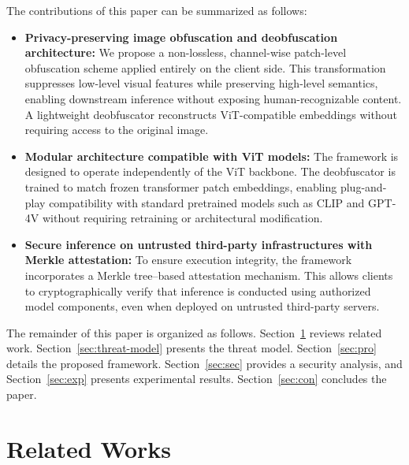 \documentclass{ieeeaccess}
\newcommand{\rev}[1]{{\color{green}#1}}
\begin{document}
The contributions of this paper can be summarized as follows:
\begin{itemize}
    \item \rev{\textbf{Privacy-preserving image obfuscation and deobfuscation architecture:} We propose a non-lossless, channel-wise patch-level obfuscation scheme applied entirely on the client side. This transformation suppresses low-level visual features while preserving high-level semantics, enabling downstream inference without exposing human-recognizable content. A lightweight deobfuscator reconstructs ViT-compatible embeddings without requiring access to the original image.}
    \item \textbf{Modular architecture compatible with ViT models:} The framework is designed to operate independently of the ViT backbone. The deobfuscator is trained to match frozen transformer patch embeddings, enabling plug-and-play compatibility with standard pretrained models such as CLIP and GPT-4V without requiring retraining or architectural modification.
    \item \textbf{Secure inference on untrusted third-party infrastructures with Merkle attestation:} To ensure execution integrity, the framework incorporates a Merkle tree--based attestation mechanism. This allows clients to cryptographically verify that inference is conducted using authorized model components, even when deployed on untrusted third-party servers.
\end{itemize}

The remainder of this paper is organized as follows. Section~\ref{sec:rel} reviews related work. Section~\ref{sec:threat-model} presents the threat model. Section~\ref{sec:pro} details the proposed framework. Section~\ref{sec:sec} provides a security analysis, and Section~\ref{sec:exp} presents experimental results. Section~\ref{sec:con} concludes the paper.

\section{Related Works} \label{sec:rel}
\end{document}
